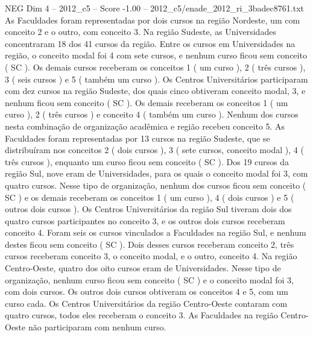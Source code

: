 \begin{textsample}{NEG Dim 4 – 2012\_c5 – Score -1.00 – 2012\_c5/enade\_2012\_ri\_3badec8761.txt}
As Faculdades foram representadas por dois cursos na região Nordeste, um com conceito 2 e o outro, com conceito 3.
Na região Sudeste, as Universidades concentraram 18 dos 41 cursos da região.
Entre os cursos em Universidades na região, o conceito modal foi 4 com sete cursos, e nenhum curso ficou sem conceito ( SC ).
Os demais cursos receberam os conceitos 1 ( um curso ), 2 ( três cursos ), 3 ( seis cursos ) e 5 ( também um curso ).
Os Centros Universitários participaram com dez cursos na região Sudeste, dos quais cinco obtiveram conceito modal, 3, e nenhum ficou sem conceito ( SC ).
Os demais receberam os conceitos 1 ( um curso ), 2 ( três cursos ) e conceito 4 ( também um curso ).
Nenhum dos cursos nesta combinação de organização acadêmica e região recebeu conceito 5.
As Faculdades foram representadas por 13 cursos na região Sudeste, que se distribuíram nos conceitos 2 ( dois cursos ), 3 ( sete cursos, conceito modal ), 4 ( três cursos ), enquanto um curso ficou sem conceito ( SC ).
Dos 19 cursos da região Sul, nove eram de Universidades, para os quais o conceito modal foi 3, com quatro cursos.
Nesse tipo de organização, nenhum dos cursos ficou sem conceito ( SC ) e os demais receberam os conceitos 1 ( um curso ), 4 ( dois cursos ) e 5 ( outros dois cursos ).
Os Centros Universitários da região Sul tiveram dois dos quatro cursos participantes no conceito 3, e os outros dois cursos receberam conceito 4.
Foram seis os cursos vinculados a Faculdades na região Sul, e nenhum destes ficou sem conceito ( SC ).
Dois desses cursos receberam conceito 2, três cursos receberam conceito 3, o conceito modal, e o outro, conceito 4.
Na região Centro-Oeste, quatro dos oito cursos eram de Universidades.
Nesse tipo de organização, nenhum curso ficou sem conceito ( SC ) e o conceito modal foi 3, com dois cursos.
Os outros dois cursos obtiveram os conceitos 4 e 5, com um curso cada.
Os Centros Universitários da região Centro-Oeste contaram com quatro cursos, todos eles receberam o conceito 3.
As Faculdades na região Centro-Oeste não participaram com nenhum curso.

\end{textsample}
